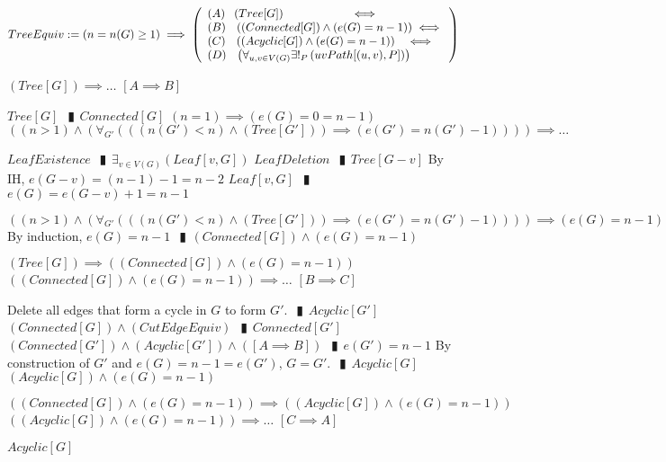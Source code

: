 \documentclass{book}
\newcommand{\abr}{:=}
\newcommand{\pipe}{$\phantom{(}\vrectangleblack\phantom{)}$}
\newcommand{\pr}[1]{\left(#1\right)}
\begin{document}
$TreeEquiv \abr \pr{n = n(G) \geq 1} \implies
\left(\begin{array}{ll}
  (A) \phantom{-} (Tree[G]) \hfill \iff \hfill \\
  (B) \phantom{-} \pr{(Connected[G]) \land \pr{e(G) = n - 1}} \hfill \iff \hfill \\
  (C) \phantom{-} \pr{(Acyclic[G]) \land \pr{e(G) = n - 1}} \hfill \iff \hfill \\
  (D) \phantom{-} \pr{\forall_{u, v \in V(G)} \exists!_{P}\pr{uvPath[(u, v), P]}}
\end{array}\right)$ \\
\begin{enumerate}
  \lit $(Tree[G]) \implies \ldots$    $[A \implies B]$
  \begin{enumerate}
    \lit $Tree[G]$ \pipe $Connected[G]$
    \lit $(n = 1) \implies \pr{e(G) = 0 = n - 1}$
    \lit $\pr{(n > 1) \land \pr{\forall_{G'}\pr{\pr{\pr{n(G') < n} \land (Tree[G'])} \implies \pr{e(G') = n(G') - 1}}}} \implies \ldots$
    \begin{enumerate}
      \lit $LeafExistence$ \pipe $\exists_{v \in V(G)}(Leaf[v, G])$
      \lit $LeafDeletion$ \pipe $Tree[G - v]$
      \lit By IH, $e(G - v) = (n - 1) - 1 = n - 2$
      \lit $Leaf[v, G]$ \pipe $e(G) = e(G - v) + 1 = n - 1$
    \end{enumerate}
    \lit $\pr{(n > 1) \land \pr{\forall_{G'}\pr{\pr{\pr{n(G') < n} \land (Tree[G'])} \implies \pr{e(G') = n(G') - 1}}}} \implies \pr{e(G) = n - 1}$
    \lit By induction, $e(G) = n - 1$ \pipe $(Connected[G]) \land \pr{e(G) = n - 1}$
  \end{enumerate}
  \lit $(Tree[G]) \implies \pr{(Connected[G]) \land \pr{e(G) = n - 1}}$
  \lit $\pr{(Connected[G]) \land \pr{e(G) = n - 1}} \implies \ldots$    $[B \implies C]$
  \begin{enumerate}
    \lit Delete all edges that form a cycle in $G$ to form $G'$. \pipe $Acyclic[G']$
    \lit $(Connected[G]) \land (CutEdgeEquiv)$ \pipe $Connected[G']$
    \lit $(Connected[G']) \land (Acyclic[G']) \land ([A \implies B])$ \pipe $e(G') = n - 1$
    \lit By construction of $G'$ and $e(G) = n - 1 = e(G')$, $G = G'$. \pipe $Acyclic[G]$
    \lit $(Acyclic[G]) \land \pr{e(G) = n - 1}$
  \end{enumerate}
  \lit $\pr{(Connected[G]) \land \pr{e(G) = n - 1}} \implies \pr{(Acyclic[G]) \land \pr{e(G) = n - 1}}$
  \lit $\pr{(Acyclic[G]) \land \pr{e(G) = n - 1}} \implies \ldots$    $[C \implies A]$
  \begin{enumerate}
    \lit $Acyclic[G]$

\end{enumerate}
\end{enumerate}
\end{document}
